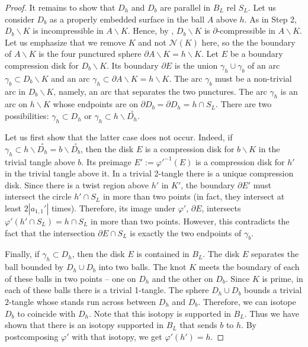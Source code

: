 \documentclass[12pt,reqno]{amsart}
\theoremstyle{plain}
\theoremstyle{definition}
\newcommand{\NN}{\mathcal{N}}
\newcommand{\ssm}{\smallsetminus}
\begin{document}
\begin{proof}
It remains to show that $D_h$ and $D_b$ are parallel in $B_L$ rel $S_L$. 
Let us consider $D_b$ as a properly embedded surface in the ball $A$ above $h$.
As in Step 2, $D_b \ssm  K$ is incompressible in $A \ssm K$.  Hence, 
by \cite[Lemma 3.6]{ScharlemannTomova2008Uniqueness}, $D_b \ssm K$ is 
$\partial$-compressible in $A\ssm K$. Let us emphasize that we remove $K$ and 
not $\NN(K)$ here, so the the boundary of $A\ssm K$ is the four punctured sphere 
$\partial A \ssm  K = h \ssm K$. Let $E$ be a boundary compression disk for 
$D_b \ssm  K$. Its boundary $\partial E$ is the union  $\gamma_h \cup \gamma_b$ 
of an arc $\gamma_b \subset D_b \ssm K$ and an arc 
$\gamma_h \subset \partial A \ssm K = h \ssm K$.
The arc $\gamma_b$ must be a non-trivial arc in $D_b \ssm K$, namely, an arc 
that separates the two punctures. The arc $\gamma_h$ is an arc on $h\ssm K$ 
whose endpoints are on $\partial D_b = \partial D_h = h\cap S_L$. There are two 
possibilities: $\gamma_h \subset D_h$ or $\gamma_h \subset h \ssm \overset{\circ}{D_h} $.

Let us first show that the latter case does not occur. Indeed, if 
$\gamma_h\subset h \ssm \overset{\circ}{D_h} =  b\ssm \overset{\circ}{D_b}$, 
then the disk $E$ is a compression disk for $b \ssm K$ in the trivial tangle 
above $b$. Its preimage $E':=\varphi'^{-1}(E)$ is a compression disk for $h'$ 
in the trivial tangle above it. In a trivial 2-tangle there is a unique 
compression disk. Since there is a twist region above $h'$ in $K'$, the 
boundary $\partial E'$ must intersect the circle $h'\cap S_L$ in more than 
two points (in fact, they intersect at least $2|a_{1,1}'|$ times). Therefore, its 
image under $\varphi'$, $\partial E$, intersects $\varphi'(h'\cap S_L)=h\cap S_L$ 
in more than two points. However, this contradicts the fact that the intersection 
$\partial E\cap S_L$ is exactly the two endpoints of $\gamma_b$.

Finally, if $\gamma_h \subset D_h$, then the disk $E$ is contained in $B_L$. 
The disk $E$ separates the ball bounded by $D_h \cup D_b$ into two balls. 
The knot $K$ meets the boundary of each of these balls in two points -- one 
on $D_h$ and the other on $D_b$. Since $K$ is prime, in each of these balls 
there is a trivial 1-tangle. The sphere $D_h \cup D_b$ bounds a trivial $2$-tangle 
whose stands run across between $D_h$ and $D_b$. Therefore, we can isotope $D_b$ 
to coincide with $D_h$. Note that this isotopy is supported in $B_L$. Thus we 
have shown that there is an isotopy supported in $B_L$ that sends $b$ to $h$. 
By postcomposing $\varphi'$ with that isotopy, we get $\varphi'(h')=h$.
\end{proof}
\end{document}
